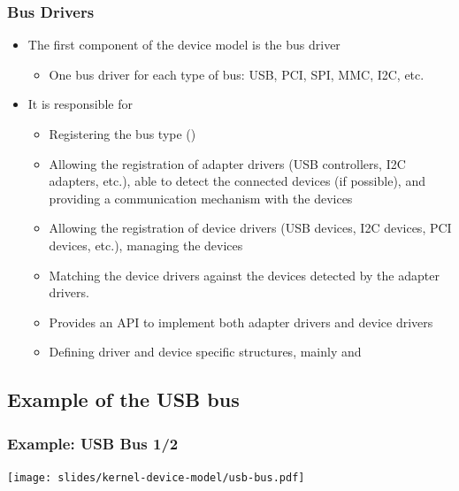 \begin{frame}
  \frametitle{Bus Drivers}
  \begin{itemize}
  \item The first component of the device model is the bus driver
    \begin{itemize}
    \item One bus driver for each type of bus: USB, PCI, SPI, MMC,
      I2C, etc.
    \end{itemize}
  \item It is responsible for
    \begin{itemize}
    \item Registering the bus type ()
    \item Allowing the registration of adapter drivers (USB
      controllers, I2C adapters, etc.), able to detect the
      connected devices (if possible), and providing a
      communication mechanism with the devices
    \item Allowing the registration of device drivers (USB devices,
      I2C devices, PCI devices, etc.), managing the devices
    \item Matching the device drivers against the devices detected by
      the adapter drivers.
    \item Provides an API to implement both adapter drivers and device drivers
    \item Defining driver and device specific structures, mainly
       and 
    \end{itemize}
  \end{itemize}
\end{frame}

\subsection{Example of the USB bus}

\begin{frame}
\frametitle{Example: USB Bus 1/2}
  \begin{center}
    \texttt{[image: slides/kernel-device-model/usb-bus.pdf]}
  \end{center}
\end{frame}

